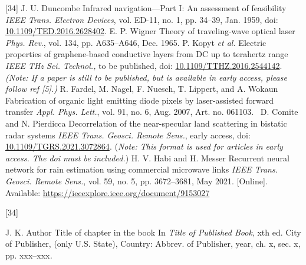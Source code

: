 \documentclass[correspondence]{IEEEtaes}
\begin{document}
\vspace*{-12pt}
\begin{thebibliography}{[34]}
\setcounter{enumiv}{0}
J. U. Duncombe
\newblock Infrared navigation---Part I: An assessment of feasibility
\newblock \emph{IEEE Trans. Electron Devices}, vol. ED-11, no. 1, pp. 34--39, Jan. 1959, doi: \href{https://dx.doi.org/10.1109/TED.2016.2628402}{10.1109/TED.2016.2628402}.
E. P. Wigner
\newblock Theory of traveling-wave optical laser
\newblock \emph{Phys. Rev}., vol. 134, pp. A635--A646, Dec. 1965.
P. Kopyt \emph{et al.}
\newblock Electric properties of graphene-based conductive layers from DC up to terahertz range
\newblock \emph{IEEE THz Sci. Technol.,} to be published, doi: \href{https://dx.doi.org/10.1109/TTHZ.2016.2544142}{\url{10.1109/TTHZ.2016.2544142}}. \emph{(Note: If a paper is still to be published, but is available in early access, please follow ref {[}5{]}.)}
R. Fardel, M. Nagel, F. Nuesch, T. Lippert, and A. Wokaun
\newblock  Fabrication of organic light emitting diode pixels by laser-assisted forward transfer
\newblock \emph{Appl. Phys. Lett.}, vol. 91, no. 6, Aug. 2007, Art. no. 061103.~
D. Comite and N. Pierdicca
\newblock Decorrelation of the near-specular land scattering in bistatic radar systems
\newblock \emph{IEEE Trans. Geosci. Remote Sens.}, early access, doi: \href{https://dx.doi.org/10.1109/TGRS.2021.3072864}{\url{10.1109/TGRS.2021.3072864}}. (\emph{Note: This format is used for articles in early access. The doi must be included.})
H. V. Habi and H. Messer
\newblock Recurrent neural network for rain estimation using commercial microwave links
\newblock \emph{IEEE Trans. Geosci. Remote Sens.}, vol. 59, no. 5, pp. 3672--3681, May 2021. {[}Online{]}. Available: \href{https://ieeexplore.ieee.org/document/9153027}{\url{https://ieeexplore.ieee.org/document/9153027}}
\end{thebibliography}


\vspace*{-12pt}
\begin{thebibliography}{[34]}
\item[] J. K. Author
\newblock Title of chapter in the book
\newblock In \emph{Title of Published Book}, xth ed. City of Publisher, (only U.S. State), Country: Abbrev. of Publisher, year, ch. x, sec. {x}, pp. xxx--xxx\emph{.}
\end{thebibliography}
\end{document}
